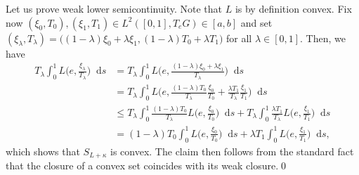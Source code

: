 \documentclass[11pt,reqno]{amsart}
\theoremstyle{plain}
\theoremstyle{definition}
\theoremstyle{plain} %
\theoremstyle{definition} %
\numberwithin{equation}{section}
\begin{document}
    Let us prove weak lower semicontinuity. Note that \( L \) is by definition convex. Fix now \( (\xi_0, T_0), (\xi_1, T_1) \in L^2([0, 1], T_eG) \in [a, b] \) and set \( (\xi_{\lambda}, T_\lambda) = \big((1 - \lambda) \xi_0 + \lambda \xi_1, (1 - \lambda) T_0 + \lambda T_1 \big) \) for all \( \lambda \in [0,1] \). Then, we have
\begin{equation*}
    \begin{aligned}
        T_{\lambda} \int_0^1 L \bigg(e, \frac{\xi_{\lambda}}{T_{\lambda}} \bigg) \mathop{}\!\mathrm{d} s &= T_{\lambda} \int_0^1 L \bigg( e, \frac{(1-\lambda) \xi_0 + \lambda \xi_1}{T_{\lambda}} \bigg) \mathop{}\!\mathrm{d} s \\
        &= T_{\lambda} \int_0^1 L \bigg( e, \frac{(1- \lambda) T_0 }{T_\lambda}\frac{\xi_0}{T_{0}} + \frac{\lambda T_1}{T_\lambda} \frac{\xi_1}{T_1} \bigg) \mathop{}\!\mathrm{d} s \\
        &\leq T_{\lambda} \int_0^1 \frac{(1 - \lambda) T_0}{T_{\lambda}} L \bigg( e, \frac{\xi_0}{T_0} \bigg) \mathop{}\!\mathrm{d} s + T_{\lambda} \int_0^1 \frac{\lambda T_1}{T_{\lambda}} L \bigg( e, \frac{\xi_1}{T_1} \bigg) \mathop{}\!\mathrm{d} s \\
        &= (1 - \lambda) T_0 \int_0^1 L \bigg( e, \frac{\xi_0}{T_0} \bigg) \mathop{}\!\mathrm{d} s + \lambda T_1 \int_0^1 L \bigg( e, \frac{\xi_1}{T_1} \bigg) \mathop{}\!\mathrm{d} s,
    \end{aligned}
\end{equation*}
which shows that \( S_{L + \kappa} \) is convex. The claim then follows from the standard fact that the closure of a convex set coincides with its weak closure.\qed

	
\end{document}

